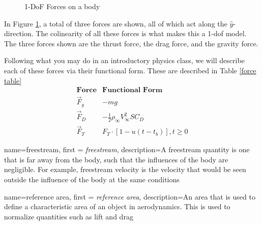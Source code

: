 \documentclass[12pt]{report}
\begin{document}
\begin{figure}[ht]
    \caption{1-DoF Forces on a body}
    \label{fig: 1DoF forces}
\end{figure}

In Figure \ref{fig: 1DoF forces}, a total of three forces are shown, all of which act along the $\hat{y}$-direction. The colinearity of all these forces is what makes this a 1-\gls{dof} model. The three forces shown are the thrust force, the drag force, and the gravity force.

Following what you may do in an introductory physics class, we will describe each of these forces via their functional form. These are described in Table \ref{force table}
$$
\begin{array}{cc}\label{force table}
    \mathrm{\textbf{Force}}&\mathrm{\textbf{Functional Form}}\\
    \vec{F}_g &  -mg\\
     \vec{F}_D& -\frac{1}{2} \rho_{\infty} V^2_{\infty}SC_D\\
     \vec{F}_T & F_T\cdot[1-u(t-t_b)], t\ge0
\end{array}
$$

{
    name=freestream,
    first = {\textit{freestream}},
    description={A freestream quantity is one that is far away from the body, such that the influences of the body are negligible. For example, freestream velocity is the velocity that would be seen outside the influence of the body at the same conditions}
}

{
    name=reference area,
    first = \textit{reference area},
    description={An area that is used to define a characteristic area of an object in aerodynamics. This is used to normalize quantities such as lift and drag}
    }
\end{document}
